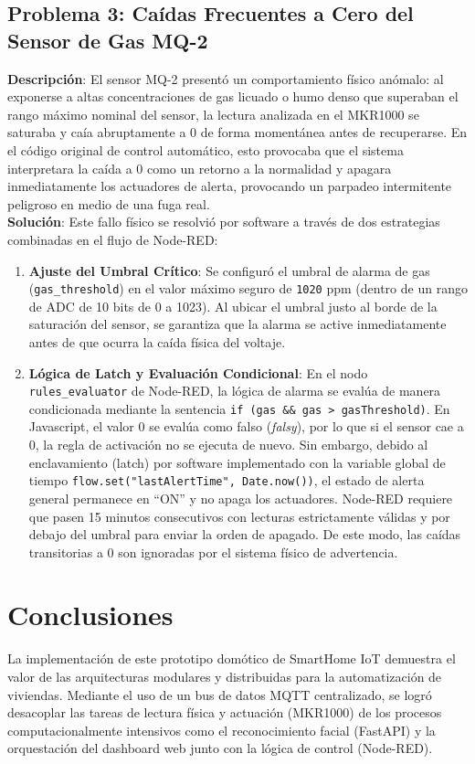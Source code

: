 \documentclass[12pt,letterpaper]{article}
\begin{document}
\subsection{Problema 3: Caídas Frecuentes a Cero del Sensor de Gas MQ-2}
\textbf{Descripción}: El sensor MQ-2 presentó un comportamiento físico anómalo: al exponerse a altas concentraciones de gas licuado o humo denso que superaban el rango máximo nominal del sensor, la lectura analizada en el MKR1000 se saturaba y caía abruptamente a 0 de forma momentánea antes de recuperarse. En el código original de control automático, esto provocaba que el sistema interpretara la caída a 0 como un retorno a la normalidad y apagara inmediatamente los actuadores de alerta, provocando un parpadeo intermitente peligroso en medio de una fuga real. \\
\textbf{Solución}: Este fallo físico se resolvió por software a través de dos estrategias combinadas en el flujo de Node-RED:
\begin{enumerate}
    \item \textbf{Ajuste del Umbral Crítico}: Se configuró el umbral de alarma de gas (\texttt{gas\_threshold}) en el valor máximo seguro de \texttt{1020} ppm (dentro de un rango de ADC de 10 bits de 0 a 1023). Al ubicar el umbral justo al borde de la saturación del sensor, se garantiza que la alarma se active inmediatamente antes de que ocurra la caída física del voltaje.
    \item \textbf{Lógica de Latch y Evaluación Condicional}: En el nodo \texttt{rules\_evaluator} de Node-RED, la lógica de alarma se evalúa de manera condicionada mediante la sentencia \texttt{if (gas \&\& gas > gasThreshold)}. En Javascript, el valor 0 se evalúa como falso (\emph{falsy}), por lo que si el sensor cae a 0, la regla de activación no se ejecuta de nuevo. Sin embargo, debido al enclavamiento (latch) por software implementado con la variable global de tiempo \texttt{flow.set("lastAlertTime", Date.now())}, el estado de alerta general permanece en ``ON'' y no apaga los actuadores. Node-RED requiere que pasen 15 minutos consecutivos con lecturas estrictamente válidas y por debajo del umbral para enviar la orden de apagado. De este modo, las caídas transitorias a 0 son ignoradas por el sistema físico de advertencia.
\end{enumerate}

\newpage
\section{Conclusiones}
La implementación de este prototipo domótico de SmartHome IoT demuestra el valor de las arquitecturas modulares y distribuidas para la automatización de viviendas. Mediante el uso de un bus de datos MQTT centralizado, se logró desacoplar las tareas de lectura física y actuación (MKR1000) de los procesos computacionalmente intensivos como el reconocimiento facial (FastAPI) y la orquestación del dashboard web junto con la lógica de control (Node-RED).
\end{document}
